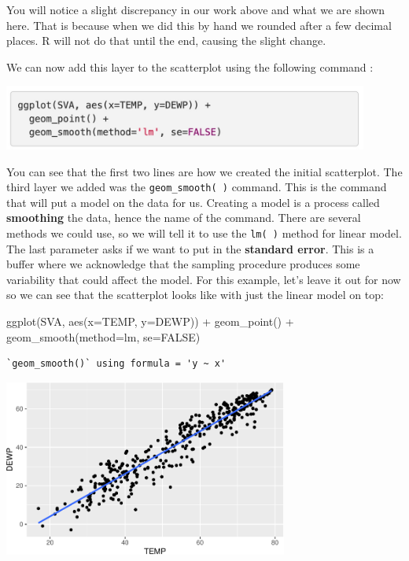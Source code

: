 \documentclass[
  letterpaper,
  DIV=11,
  numbers=noendperiod]{scrreprt}
\newenvironment{Shaded}{\begin{snugshade}}{\end{snugshade}}
\newcommand{\AttributeTok}[1]{\textcolor[rgb]{0.40,0.45,0.13}{#1}}
\newcommand{\ConstantTok}[1]{\textcolor[rgb]{0.56,0.35,0.01}{#1}}
\newcommand{\FunctionTok}[1]{\textcolor[rgb]{0.28,0.35,0.67}{#1}}
\newcommand{\NormalTok}[1]{\textcolor[rgb]{0.00,0.23,0.31}{#1}}
\newcommand{\SpecialCharTok}[1]{\textcolor[rgb]{0.37,0.37,0.37}{#1}}
\newcommand{\StringTok}[1]{\textcolor[rgb]{0.13,0.47,0.30}{#1}}
\begin{document}
You will notice a slight discrepancy in our work above and what we are
shown here. That is because when we did this by hand we rounded after a
few decimal places. R will not do that until the end, causing the slight
change.

We can now add this layer to the scatterplot using the following command
:

\includegraphics[width=0.9\textwidth,height=\textheight]{./images/LMR_11.jpg}

You can see that the first two lines are how we created the initial
scatterplot. The third layer we added was the \texttt{geom\_smooth(\ )}
command. This is the command that will put a model on the data for us.
Creating a model is a process called \textbf{smoothing} the data, hence
the name of the command. There are several methods we could use, so we
will tell it to use the \texttt{lm(\ )} method for linear model. The
last parameter asks if we want to put in the \textbf{standard error}.
This is a buffer where we acknowledge that the sampling procedure
produces some variability that could affect the model. For this example,
let's leave it out for now so we can see that the scatterplot looks like
with just the linear model on top:

\begin{Shaded}
\begin{Highlighting}[]
\FunctionTok{ggplot}\NormalTok{(SVA, }\FunctionTok{aes}\NormalTok{(}\AttributeTok{x=}\NormalTok{TEMP, }\AttributeTok{y=}\NormalTok{DEWP)) }\SpecialCharTok{+}
  \FunctionTok{geom\_point}\NormalTok{() }\SpecialCharTok{+}
  \FunctionTok{geom\_smooth}\NormalTok{(}\AttributeTok{method=}\StringTok{\textquotesingle{}lm\textquotesingle{}}\NormalTok{, }\AttributeTok{se=}\ConstantTok{FALSE}\NormalTok{)}
\end{Highlighting}
\end{Shaded}

\begin{verbatim}
`geom_smooth()` using formula = 'y ~ x'
\end{verbatim}

\begin{center}
\includegraphics[width=0.7\textwidth,height=\textheight]{Linear_Modeling_and_Regression_files/figure-pdf/unnamed-chunk-12-1.pdf}
\end{center}
\end{document}
